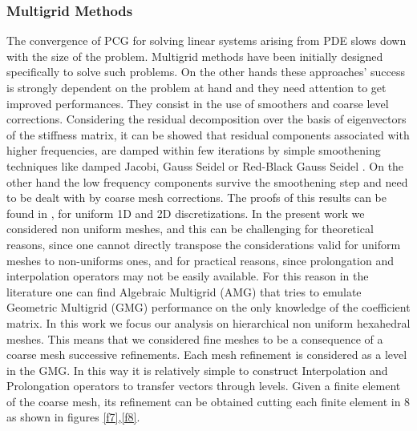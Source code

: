 \subsubsection{Multigrid Methods}
\label{multigrid}
The convergence of PCG for solving linear systems arising from PDE slows down with the size of the problem. Multigrid methods \cite{trottenberg2001multigrid} have been initially designed specifically to solve such problems. On the other hands these approaches' success is strongly dependent on the problem at hand and they need attention to get improved performances. They consist in the use of smoothers and coarse level corrections. 
Considering the residual decomposition over the basis of eigenvectors of the stiffness matrix, it can be showed that residual components associated with higher frequencies, are damped within few iterations by simple smoothening techniques like damped Jacobi, Gauss Seidel or Red-Black Gauss Seidel \cite{saad2003iterative}. On the other hand the low frequency components survive the smoothening step and need to be dealt with by coarse mesh corrections. The proofs of this results can be found in \cite{saad2003iterative}, for uniform 1D and 2D discretizations. In the present work we considered non uniform meshes, and this can be challenging for theoretical reasons, since one cannot directly transpose the considerations valid for uniform meshes to non-uniforms ones, and for practical reasons, since prolongation and interpolation operators may not be easily available. For this reason in the literature one can find Algebraic Multigrid (AMG) \cite{stuben2001review} that tries to emulate Geometric Multigrid (GMG) performance on the only knowledge of the coefficient matrix. In this work we focus our analysis on hierarchical non uniform hexahedral meshes.  This means that we considered fine meshes to be a consequence of a coarse mesh successive refinements. Each mesh refinement is considered as a level in the GMG.
In this way it is relatively simple to construct Interpolation and Prolongation operators to transfer vectors through levels.
Given a finite element of the coarse mesh, its refinement can be obtained cutting each finite element in 8 as shown in figures
\ref{f7},\ref{f8}.  

